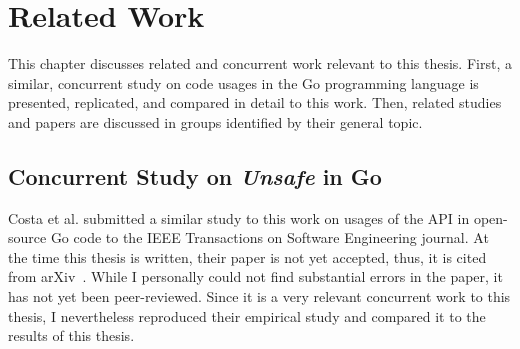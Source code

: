 
\chapter{Related Work}\label{ch:related-work}

This chapter discusses related and concurrent work relevant to this thesis.
First, a similar, concurrent study on \unsafe{} code usages in the Go programming language is presented, replicated, and
compared in detail to this work.
Then, related studies and papers are discussed in groups identified by their general topic.



\section{Concurrent Study on \textit{Unsafe} in Go}\label{sec:related-work:concurrent-study}

Costa et al. submitted a similar study to this work on usages of the \unsafe{} \acrshort{API} in open-source Go code to
the IEEE Transactions on Software Engineering journal.
At the time this thesis is written, their paper is not yet accepted, thus, it is cited from arXiv~\cite{costa2020}.
While I personally could not find substantial errors in the paper, it has not yet been peer-reviewed.
Since it is a very relevant concurrent work to this thesis, I nevertheless reproduced their empirical study and compared
it to the results of this thesis.

